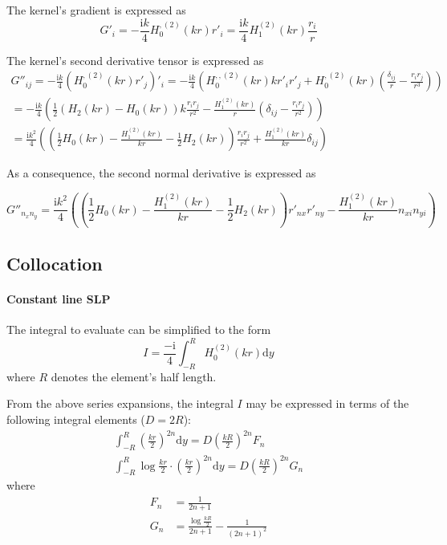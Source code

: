 \documentclass[a4paper,11pt]{article}
\newcommand{\td}{\mathrm{d}}
\newcommand{\ti}{\mathrm{i}}
\begin{document}
The kernel's gradient is expressed as
%
\begin{equation}
	G'_i = -\frac{\ti k}{4} H_0^{,(2)}(kr) r'_i
	= \frac{\ti k}{4} H_1^{(2)}(kr) \frac{r_i}{r}
\end{equation}


The kernel's second derivative tensor is expressed as
%
\begin{multline}
	G''_{ij}
	= -\frac{\ti k}{4} \left( H_0^{,(2)}(kr) r'_j \right)'_i
	= -\frac{\ti k}{4} \left( H_0^{,,(2)}(kr) k r'_i r'_j + H_0^{,(2)}(kr) \left(\frac{\delta_{ij}}{r} - \frac{r_i r_j}{r^3}\right)\right) \\
	= -\frac{\ti k}{4} \left( \frac{1}{2} \left(H_2(kr) - H_0(kr) \right) k \frac{r_i r_j}{r^2} - \frac{H_1^{(2)}(kr)}{r} \left(\delta_{ij} - \frac{r_i r_j}{r^2}\right)\right) \\
	= \frac{\ti k^2}{4} \left( \left( \frac{1}{2} H_0(kr) - \frac{H_1^{(2)}(kr)}{kr} -\frac{1}{2} H_2(kr) \right) \frac{r_i r_j}{r^2} + \frac{H_1^{(2)}(kr)}{kr} \delta_{ij} \right)
\end{multline}

As a consequence, the second normal derivative is expressed as

\begin{equation}
	G''_{n_{x} n_{y}}
	= \frac{\ti k^2}{4} \left( \left( \frac{1}{2} H_0(kr) - \frac{H_1^{(2)}(kr)}{kr} -\frac{1}{2} H_2(kr) \right)
	r'_{nx} r'_{ny}
	- \frac{H_1^{(2)}(kr)}{kr} n_{xi} n_{yi}\right)
\end{equation}


\subsection{Collocation}

\paragraph{Constant line SLP}

The integral to evaluate can be simplified to the form
%
\begin{equation}
I = \frac{-\ti}{4} \int_{-R}^R  H_0^{(2)}(kr)  \td y
\end{equation}
%
where $R$ denotes the element's half length.

From the above series expansions, the integral $I$ may be expressed in terms of the following integral elements ($D = 2R$):
%
\begin{align}
\int_{-R}^R
\left(\frac{kr}{2}\right)^{2n} \td y
= D \left( \frac{kR}{2} \right)^{2n} F_n \\
\int_{-R}^R
\log \frac{kr}{2} \cdot \left(\frac{kr}{2}\right)^{2n} \td y
= D \left(\frac{kR}{2}\right)^{2 n} G_n
\end{align}
%
where
%
\begin{align}
F_n &= \frac{1}{2n+1} \\
G_n &= \frac{\log\frac{kR}{2}} {2 n + 1} - \frac{1}{(2 n + 1)^2}
\end{align}
\end{document}
